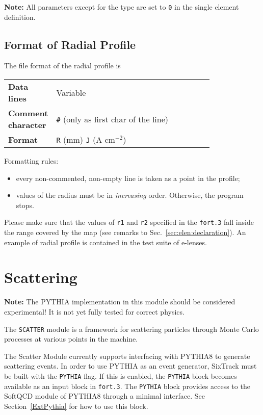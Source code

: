 \bigskip
\noindent \textbf{Note:} All parameters except for the type are set to \texttt{0} in the single element definition.

\subsection{Format of Radial Profile} \label{sec:elen_rad_prof}
The file format of the radial profile is

\bigskip
\begin{tabular}{@{}lp{0.8\linewidth}}
    \textbf{Data lines} & Variable \\
    \textbf{Comment character} & \texttt{\#} (only as first char of the line) \\
    \textbf{Format}     & \texttt{R} (mm) \texttt{J} (A cm$^{-2}$) \\
\end{tabular}

\bigskip
\noindent Formatting rules:
\begin{itemize}
\item every non-commented, non-empty line is taken as a point in the profile;
\item values of the radius must be in \emph{increasing} order. Otherwise, the program stops.
\end{itemize}

\noindent Please make sure that the values of \texttt{r1} and \texttt{r2} specified in the \texttt{fort.3} fall inside the range covered by the map (see remarks to Sec.~\ref{sec:elen:declaration}). An example of radial profile is contained in the test suite of e-lenses.

\section{Scattering} \label{sec:scatter}

\textcolor{notered}{\textbf{Note:} The PYTHIA implementation in this module should be considered experimental! It is not yet fully tested for correct physics.}

The \texttt{SCATTER} module is a framework for scattering particles through Monte Carlo processes at various points in the machine.

The Scatter Module currently supports interfacing with PYTHIA8 to generate scattering events.
In order to use PYTHIA as an event generator, SixTrack must be built with the \texttt{PYTHIA} flag.
If this is enabled, the \texttt{PYTHIA} block becomes available as an input block in \texttt{fort.3}.
The \texttt{PYTHIA} block provides access to the SoftQCD module of PYTHIA8 through a minimal interface.
See Section~\ref{ExtPythia} for how to use this block.

